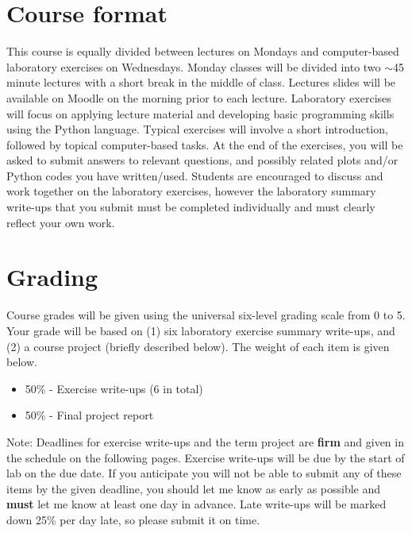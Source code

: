 \documentclass[11pt,a4paper]{article}
\begin{document}
\section*{Course format}
This course is equally divided between lectures on Mondays and computer-based laboratory exercises on Wednesdays.
Monday classes will be divided into two $\sim$45 minute lectures with a short break in the middle of class.
Lectures slides will be available on Moodle on the morning prior to each lecture.
Laboratory exercises will focus on applying lecture material and developing basic programming skills using the Python language.
Typical exercises will involve a short introduction, followed by topical computer-based tasks.
At the end of the exercises, you will be asked to submit answers to relevant questions, and possibly related plots and/or Python codes you have written/used.
Students are encouraged to discuss and work together on the laboratory exercises, however the laboratory summary write-ups that you submit must be completed individually and must clearly reflect your own work.

\section*{Grading}
Course grades will be given using the universal six-level grading scale from 0 to 5.
Your grade will be based on (1) six laboratory exercise summary write-ups, and (2) a course project (briefly described below).
The weight of each item is given below.
\begin{itemize}
  \item 50\% - Exercise write-ups (6 in total)
  \item 50\% - Final project report
\end{itemize}
Note: Deadlines for exercise write-ups and the term project are \textbf{firm} and given in the schedule on the following pages.
Exercise write-ups will be due by the start of lab on the due date.
If you anticipate you will not be able to submit any of these items by the given deadline, you should let me know as early as possible and \textbf{must} let me know at least one day in advance.
Late write-ups will be marked down 25\% per day late, so please submit it on time.
\end{document}
